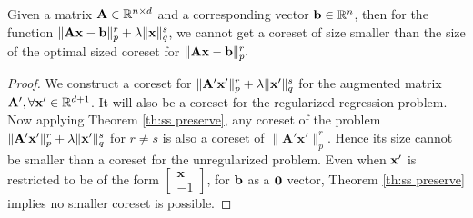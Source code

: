 \begin{corollary}\label{cor: impos res}
	Given a matrix $\mathbf{A} \in \mathbb{R}^{n \times d} $ and a corresponding vector $\mathbf{b} \in \mathbb{R}^{n}$, then for the function $\|\mathbf{A}\mathbf{x} - \mathbf{b}\|_p^r	+ \lambda \|\mathbf{x}\|_q^s$, we cannot get a coreset of size smaller than the size of the optimal sized coreset for $\|\mathbf{A}\mathbf{x} - \mathbf{b}\|_p^r.$
	\begin{proof}
	We construct a coreset for  $\|\mathbf{A'x'}\|_p^r + \lambda \|\mathbf{x'}\|_q^s$ for the augmented matrix $\mathbf{A'}, \forall \mathbf{x'} \in \mathbb{R}^{d+1}$. It will also be a coreset for the regularized regression problem. Now applying Theorem \ref{th:ss preserve},  any coreset  of the problem  $\|\mathbf{A'x'}\|_p^r + \lambda \|\mathbf{x'}\|_q^s $ for $r\neq s$ is also a coreset of $\|\mathbf{A'x'}\|_p^r $.   Hence its size cannot be smaller than a coreset for the unregularized problem. Even when $\mathbf{x'}$ is restricted to be of the form $\begin{bmatrix} \mathbf{x}\\ -1 \end{bmatrix}$, for $\mathbf{b}$ as a $\mathbf{0}$ vector, Theorem \ref{th:ss preserve} implies no smaller coreset is possible.
   \end{proof}
\end{corollary}